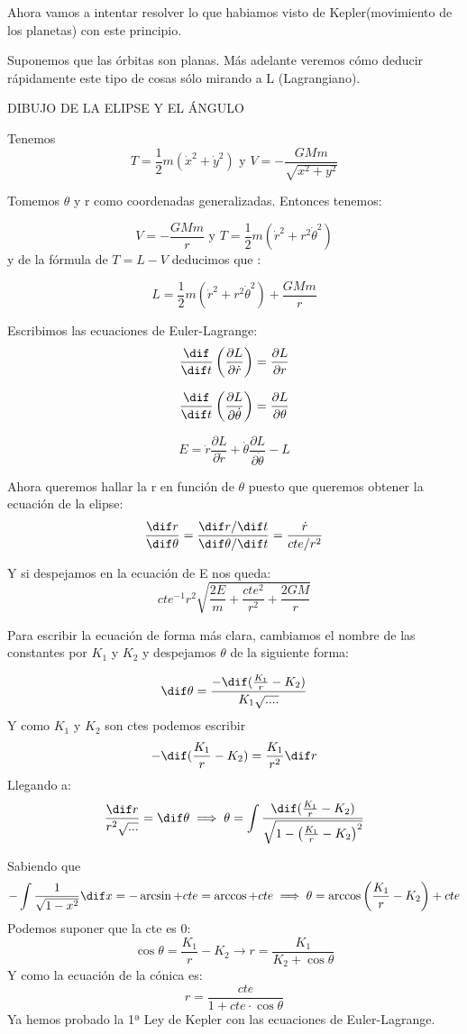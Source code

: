 \begin{example}
	Ahora vamos a intentar resolver lo que habiamos visto de Kepler(movimiento de los planetas) con este principio.

Suponemos que las órbitas son planas. Más adelante veremos cómo deducir rápidamente este tipo de cosas sólo mirando a L (Lagrangiano).

DIBUJO DE LA ELIPSE Y EL ÁNGULO

Tenemos
\[T = \frac{1}{2} m(\dot x^2 + \dot y^2) \text{ y }V = -\frac{GMm}{\sqrt{x^2 + y^2}}\]

Tomemos $\theta$ y r como coordenadas generalizadas. Entonces tenemos:


$$V= -\frac{GMm}{r}\text{ y } T= \frac{1}{2} m (\dot r^2 + r^2 \dot\theta^2)$$
y de la fórmula de $T= L-V$ deducimos que :

$$L = \frac{1}{2} m (\dot r^2 + r^2 \dot\theta^2) + \frac{GMm}{r}$$

Escribimos las ecuaciones de Euler-Lagrange:
$$\frac{\dif}{\dif t}\left(\frac{\partial L}{\partial \dot r}\right)= \frac{\partial L}{\partial r}$$

$$\frac{\dif}{\dif t}\left(\frac{\partial L}{\partial \dot \theta}\right)= \frac{\partial L}{\partial \theta}$$

$$E= \dot r \frac{\partial L}{\partial \dot r} + \dot{\theta }\frac{\partial L}{\partial \dot{\theta}} - L$$

Ahora queremos hallar la r en función de $\theta$ puesto que queremos obtener la ecuación de la elipse:
$$\frac{\dif r}{\dif \theta} = \frac{\dif r / \dif t}{\dif \theta / \dif t}= \frac{\dot r}{cte/r^2} $$

Y si despejamos en la ecuación de E nos queda: $$cte^{-1}r^2\sqrt{\frac{2E}{m}+\frac{cte^2}{r^2}+\frac{2GM}{r}}$$

Para escribir la ecuación de forma más clara, cambiamos el nombre de las constantes por $K_1$ y $K_2$ y despejamos $\theta$ de la siguiente forma:

\[\dif \theta = \frac{-\dif(\frac{K_1}{r} - K_2)}{K_1 \sqrt{....}}\]
Y como $K_1$ y $K_2$ son ctes podemos escribir
\[-\dif(\frac{K_1}{r} - K_2) = \frac{K_1}{r^2}\dif r\]
Llegando a:
$$ \frac{\dif r}{r^2\sqrt{...}}=\dif \theta \implies \theta = \int \frac{\dif ( \frac{K_1}{r} - K_2 )}{\sqrt{1 - \left(\frac{K_1}{r} - K_2\right)^2}}$$

Sabiendo que
$$- \int \frac{1}{\sqrt{1-x^2}}\dif x = -\arcsin + cte = \arccos + cte \implies \theta = \arccos \left( \frac{K_1}{r} - K_2\right) + cte$$
Podemos suponer que la cte es 0:
$$ \cos\theta = \frac{K_1}{r} - K_2 \rightarrow r = \frac{K_1}{K_2 + \cos\theta}$$
Y como la ecuación de la cónica es:
$$ r = \frac{cte}{1 + cte \cdot \cos\theta}$$
Ya hemos probado la 1ª Ley de Kepler con las ecuaciones de Euler-Lagrange.\\
\end{example}

